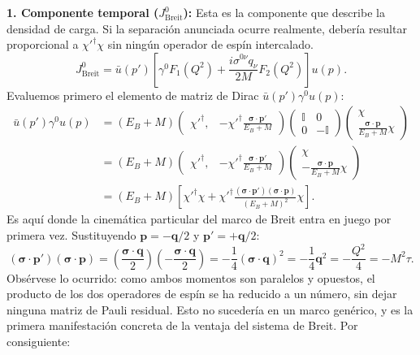 \documentclass[10pt,a4paper]{article}
\begin{document}
\textbf{1. Componente temporal ($J^0_{\text{Breit}}$):}
Esta es la componente que describe la densidad de carga. Si la separación anunciada ocurre realmente, debería resultar proporcional a $\chi'^\dagger\chi$ sin ningún operador de espín intercalado.
\begin{equation}
J^0_{\text{Breit}} = \bar{u}(p') \left[ \gamma^0 F_1(Q^2) + \frac{i \sigma^{0\nu} q_\nu}{2M} F_2(Q^2) \right] u(p).
\end{equation}
Evaluemos primero el elemento de matriz de Dirac $\bar{u}(p') \gamma^0 u(p)$:
\begin{align}
\bar{u}(p') \gamma^0 u(p) &= (E_B + M) \begin{pmatrix} \chi'^\dagger, & -\chi'^\dagger \frac{\boldsymbol{\sigma} \cdot \mathbf{p}'}{E_B + M} \end{pmatrix} \begin{pmatrix} \mathbb{I} & 0 \\ 0 & -\mathbb{I} \end{pmatrix} \begin{pmatrix} \chi \\ \frac{\boldsymbol{\sigma} \cdot \mathbf{p}}{E_B + M} \chi \end{pmatrix} \nonumber \\
&= (E_B + M) \begin{pmatrix} \chi'^\dagger, & -\chi'^\dagger \frac{\boldsymbol{\sigma} \cdot \mathbf{p}'}{E_B + M} \end{pmatrix} \begin{pmatrix} \chi \\ -\frac{\boldsymbol{\sigma} \cdot \mathbf{p}}{E_B + M} \chi \end{pmatrix} \nonumber \\
&= (E_B + M) \left[ \chi'^\dagger \chi + \chi'^\dagger \frac{(\boldsymbol{\sigma} \cdot \mathbf{p}')(\boldsymbol{\sigma} \cdot \mathbf{p})}{(E_B + M)^2} \chi \right].
\end{align}
Es aquí donde la cinemática particular del marco de Breit entra en juego por primera vez. Sustituyendo $\mathbf{p} = -\mathbf{q}/2$ y $\mathbf{p}' = +\mathbf{q}/2$:
\begin{equation}
(\boldsymbol{\sigma} \cdot \mathbf{p}')(\boldsymbol{\sigma} \cdot \mathbf{p}) = \left( \frac{\boldsymbol{\sigma} \cdot \mathbf{q}}{2} \right) \left( -\frac{\boldsymbol{\sigma} \cdot \mathbf{q}}{2} \right) = -\frac{1}{4} (\boldsymbol{\sigma} \cdot \mathbf{q})^2 = -\frac{1}{4} \mathbf{q}^2 = -\frac{Q^2}{4} = - M^2 \tau.
\end{equation}
Obsérvese lo ocurrido: como ambos momentos son paralelos y opuestos, el producto de los dos operadores de espín se ha reducido a un número, sin dejar ninguna matriz de Pauli residual. Esto no sucedería en un marco genérico, y es la primera manifestación concreta de la ventaja del sistema de Breit. Por consiguiente:
\end{document}
